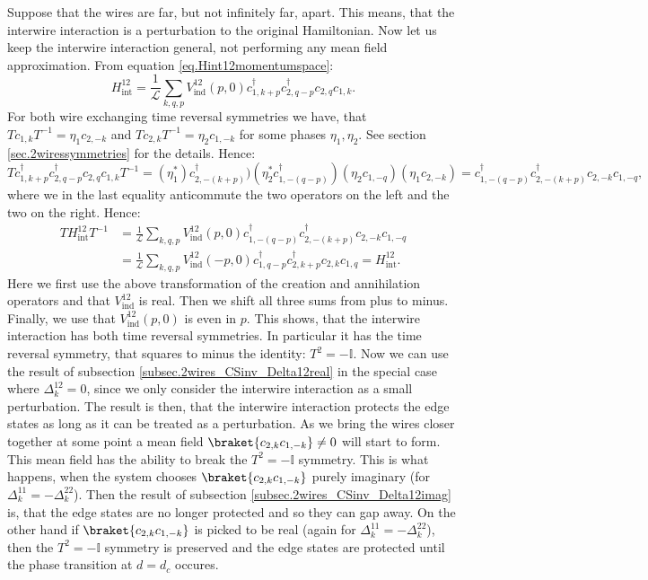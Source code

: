 Suppose that the wires are far, but not infinitely far, apart. This means, that the interwire interaction is a perturbation to the original Hamiltonian. Now let us keep the interwire interaction general, not performing any mean field approximation. From equation \eqref{eq.Hint12momentumspace}:
\begin{equation}
H_\text{int}^{12} = \frac{1}{\mathcal{L}}\sum_{k,q,p} V_{\text{ind}}^{12}(p,0) c^\dagger_{1,k + p} c^\dagger_{2, q - p} c_{2, q} c_{1, k}. \nonumber
\end{equation}
For both wire exchanging time reversal symmetries we have, that $Tc_{1, k}T^{-1} = \eta_1c_{2, -k}$ and $Tc_{2, k}T^{-1} = \eta_2c_{1, -k}$ for some phases $\eta_1, \eta_2$. See section \ref{sec.2wiressymmetries} for the details. Hence:
\begin{equation}
Tc^\dagger_{1,k + p} c^\dagger_{2, q - p} c_{2, q} c_{1, k}T^{-1} = (\eta_1^*)c^\dagger_{2,-(k + p)})(\eta_2^* c^\dagger_{1, -(q - p)})(\eta_2c_{1, -q})(\eta_1 c_{2, -k}) = c^\dagger_{1, -(q - p)}c^\dagger_{2,-(k + p)}c_{2, -k}c_{1, -q}, \nonumber 
\end{equation}
where we in the last equality anticommute the two operators on the left and the two on the right. Hence:
\begin{align}
TH_\text{int}^{12}T^{-1} &= \frac{1}{\mathcal{L}}\sum_{k,q,p} V_{\text{ind}}^{12}(p,0) c^\dagger_{1, -(q - p)}c^\dagger_{2,-(k + p)}c_{2, -k}c_{1, -q} \nonumber \\
&= \frac{1}{\mathcal{L}}\sum_{k,q,p} V_{\text{ind}}^{12}(-p,0) c^\dagger_{1, q - p}c^\dagger_{2, k + p }c_{2, k}c_{1, q} = H_\text{int}^{12}. \nonumber 
\end{align}
Here we first use the above transformation of the creation and annihilation operators and that $V_{\text{ind}}^{12}$ is real. Then we shift all three sums from plus to minus. Finally, we use that $V_{\text{ind}}^{12}(p,0)$ is even in $p$. This shows, that the interwire interaction has both time reversal symmetries. In particular it has the time reversal symmetry, that squares to minus the identity: $T^2 = -\mathbb{I}$. Now we can use the result of subsection \ref{subsec.2wires_CSinv_Delta12real} in the special case where $\Delta^{12}_k = 0$, since we only consider the interwire interaction as a small perturbation. The result is then, that the interwire interaction protects the edge states as long as it can be treated as a perturbation. As we bring the wires closer together at some point a mean field $\braket{c_{2,k}c_{1,-k}} \neq 0$ will start to form. This mean field has the ability to break the $T^2 = -\mathbb{I}$ symmetry. This is what happens, when the system chooses $\braket{c_{2,k}c_{1,-k}}$ purely imaginary (for $\Delta^{11}_k = -\Delta^{22}_k$). Then the result of subsection \ref{subsec.2wires_CSinv_Delta12imag} is, that the edge states are no longer protected and so they can gap away. On the other hand if $\braket{c_{2,k}c_{1,-k}}$ is picked to be real (again for $\Delta^{11}_k = -\Delta^{22}_k$), then the $T^2 = -\mathbb{I}$ symmetry is preserved and the edge states are protected until the phase transition at $d = d_c$ occures. 


